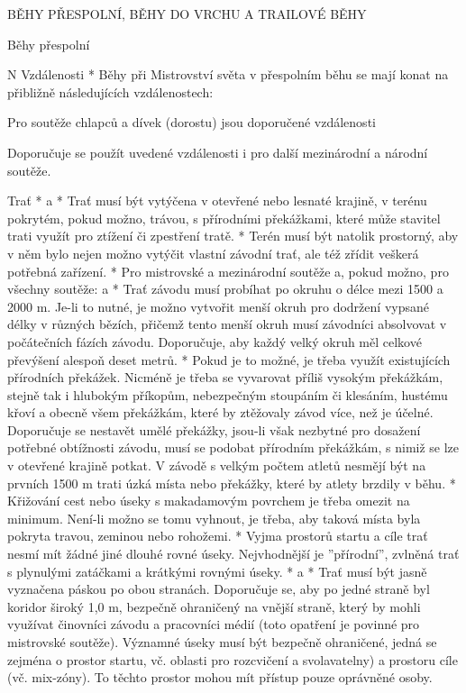 \sec BĚHY PŘESPOLNÍ, BĚHY DO VRCHU A TRAILOVÉ BĚHY

\secc Běhy přespolní

\begitems \style N
Vzdálenosti
* Běhy při Mistrovství světa v přespolním běhu se mají konat na přibližně následujících vzdálenostech:


Pro soutěže chlapců a dívek (dorostu) jsou doporučené vzdálenosti


Doporučuje se použít uvedené vzdálenosti i pro další mezinárodní a národní soutěže.

Trať
* \begitems \style a
  * Trať musí být vytýčena v otevřené nebo lesnaté krajině, v terénu pokrytém, pokud možno, trávou, s přírodními překážkami, které může stavitel trati využít pro ztížení či zpestření tratě.
  * Terén musí být natolik prostorný, aby v něm bylo nejen možno vytýčit vlastní závodní trať, ale též zřídit veškerá potřebná zařízení.
  \enditems
* Pro mistrovské a mezinárodní soutěže a, pokud možno, pro všechny soutěže:
  \begitems \style a
  * Trať závodu musí probíhat po okruhu o délce mezi 1500 a 2000 m. Je-li to nutné, je možno vytvořit menší okruh pro dodržení vypsané délky v různých bězích, přičemž tento menší okruh musí závodníci absolvovat v počátečních fázích závodu. Doporučuje, aby každý velký okruh měl celkové převýšení alespoň deset metrů.
  * Pokud je to možné, je třeba využít existujících přírodních překážek. Nicméně je třeba se vyvarovat příliš vysokým překážkám, stejně tak i hlubokým příkopům, nebezpečným stoupáním či klesáním, hustému křoví a obecně všem překážkám, které by ztěžovaly závod více, než je účelné. Doporučuje se nestavět umělé překážky, jsou-li však nezbytné pro dosažení potřebné obtížnosti závodu, musí se podobat přírodním překážkám, s nimiž se lze v otevřené krajině potkat. V závodě s velkým počtem atletů nesmějí být na prvních 1500 m trati úzká místa nebo překážky, které by atlety brzdily v běhu.
  * Křižování cest nebo úseky s makadamovým povrchem je třeba omezit na minimum. Není-li možno se tomu vyhnout, je třeba, aby taková místa byla pokryta travou, zeminou nebo rohožemi.
  * Vyjma prostorů startu a cíle trať nesmí mít žádné jiné dlouhé rovné úseky. Nejvhodnější je ”přírodní”, zvlněná trať s plynulými zatáčkami a krátkými rovnými úseky.
  \enditems
* \begitems \style a
  * Trať musí být jasně vyznačena páskou po obou stranách. Doporučuje se, aby po jedné straně byl koridor široký 1,0 m, bezpečně ohraničený na vnější straně, který by mohli využívat činovníci závodu a pracovníci médií (toto opatření je povinné pro mistrovské soutěže). Významné úseky musí být bezpečně ohraničené, jedná se zejména o prostor startu, vč. oblasti pro rozcvičení a svolavatelny) a prostoru cíle (vč. mix-zóny). To těchto prostor mohou mít přístup pouze oprávněné osoby.
